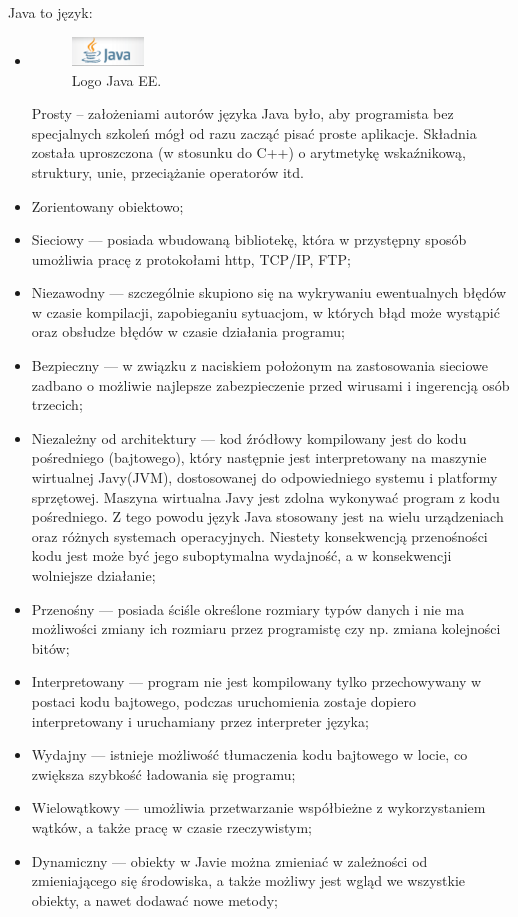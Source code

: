 \documentclass[eng,printmode,oneside]{mgr}
\begin{document}
Java to język:

\begin{itemize}
  \item  \parbox[t]{\dimexpr\textwidth-\leftmargin}{
      \vspace{-2.5mm}
    \begin{figure}
	\centering
	\includegraphics[width=0.18\textwidth]{javaEE.png}
	\caption{\label{fig:javaEE}Logo Java EE.}
	\end{figure}
  Prosty -- założeniami autorów języka Java było, aby programista bez
  specjalnych szkoleń mógł od razu zacząć pisać proste aplikacje. Składnia
  została uproszczona (w stosunku do C++) o arytmetykę wskaźnikową, struktury,
  unie, przeciążanie operatorów itd. 
	}
  \item Zorientowany obiektowo;
  \item Sieciowy --- posiada wbudowaną bibliotekę, która w przystępny sposób
  umożliwia pracę z protokołami http, TCP/IP, FTP;
  \item Niezawodny --- szczególnie skupiono się na wykrywaniu ewentualnych
  błędów w czasie kompilacji, zapobieganiu sytuacjom, w których błąd może
  wystąpić oraz obsłudze błędów w czasie działania programu;
  \item Bezpieczny --- w związku z naciskiem położonym na zastosowania sieciowe
  zadbano o możliwie najlepsze zabezpieczenie przed wirusami i ingerencją osób
  trzecich;
  \item Niezależny od architektury --- kod źródłowy kompilowany jest do kodu
  pośredniego (bajtowego), który następnie jest interpretowany na maszynie
  wirtualnej Javy(JVM), dostosowanej do odpowiedniego systemu i platformy sprzętowej. Maszyna
  wirtualna Javy jest zdolna wykonywać program z kodu pośredniego. Z tego powodu język Java
  stosowany jest na wielu urządzeniach oraz różnych systemach operacyjnych.
  Niestety konsekwencją przenośności kodu jest może być jego suboptymalna
  wydajność, a w konsekwencji wolniejsze działanie;
  \item Przenośny --- posiada ściśle określone rozmiary typów danych i nie ma
  możliwości zmiany ich rozmiaru przez programistę czy np.
  zmiana kolejności bitów;
  \item Interpretowany --- program nie jest kompilowany tylko przechowywany w
  postaci kodu bajtowego, podczas uruchomienia zostaje dopiero interpretowany i
  uruchamiany przez interpreter języka;
  \item Wydajny --- istnieje możliwość tłumaczenia kodu bajtowego w locie,
  co zwiększa szybkość ładowania się programu;
  \item Wielowątkowy --- umożliwia przetwarzanie współbieżne z wykorzystaniem
  wątków, a także pracę w czasie rzeczywistym;
  \item Dynamiczny --- obiekty w Javie można zmieniać w zależności od
  zmieniającego się środowiska, a także możliwy jest wgląd we wszystkie obiekty,
  a nawet dodawać nowe metody;
\end{itemize}
\end{document}

